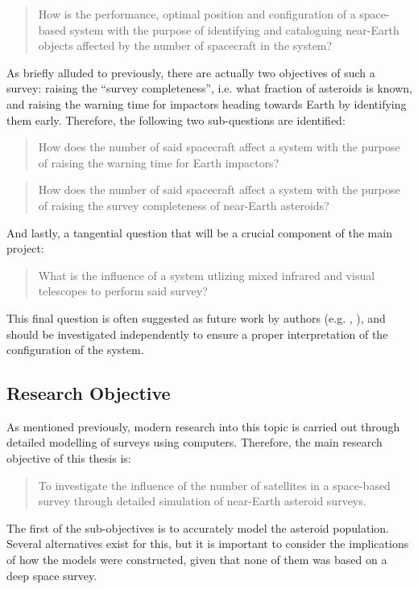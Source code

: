 \documentclass[12pt, english, NoHyper]{AE4010-template}
\begin{document}
\begin{quote}
 How is the performance, optimal position and configuration of a space-based system with the purpose of identifying and cataloguing near-Earth objects affected by the number of spacecraft in the system?
\end{quote}

As briefly alluded to previously, there are actually two objectives of such a survey: raising the ``survey completeness'', i.e. what fraction of asteroids is known, and raising the warning time for impactors heading towards Earth by identifying them early. Therefore, the following two sub-questions are identified:

\begin{quote}
 How does the number of said spacecraft affect a system with the purpose of raising the warning time for Earth impactors?
\end{quote}
\begin{quote}
 How does the number of said spacecraft affect a system with the purpose of raising the survey completeness of near-Earth asteroids?
\end{quote}

And lastly, a tangential question that will be a crucial component of the main project:

\begin{quote}
 What is the influence of a system utlizing mixed infrared and visual telescopes to perform said survey?
\end{quote}

This final question is often suggested as future work by authors (e.g. \cite{AsteroidsInTIR}, \cite{AsteroidSTM}), and should be investigated independently to ensure a proper interpretation of the configuration of the system.

\subsection{Research Objective}
As mentioned previously, modern research into this topic is carried out through detailed modelling of surveys using computers. Therefore, the main research objective of this thesis is:

\begin{quote}
To investigate the influence of the number of satellites in a space-based survey through detailed simulation of near-Earth asteroid surveys.
\end{quote}

The first of the sub-objectives is to accurately model the asteroid population. Several alternatives exist for this, but it is important to consider the implications of how the models were constructed, given that none of them was based on a deep space survey.\\
\end{document}
